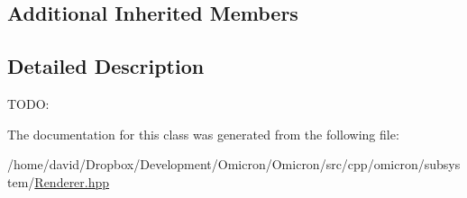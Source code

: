 \subsection*{Additional Inherited Members}


\subsection{Detailed Description}
T\+O\+DO\+: 

The documentation for this class was generated from the following file\+:\begin{DoxyCompactItemize}
\item 
/home/david/\+Dropbox/\+Development/\+Omicron/\+Omicron/src/cpp/omicron/subsystem/\hyperlink{_renderer_8hpp}{Renderer.\+hpp}\end{DoxyCompactItemize}
